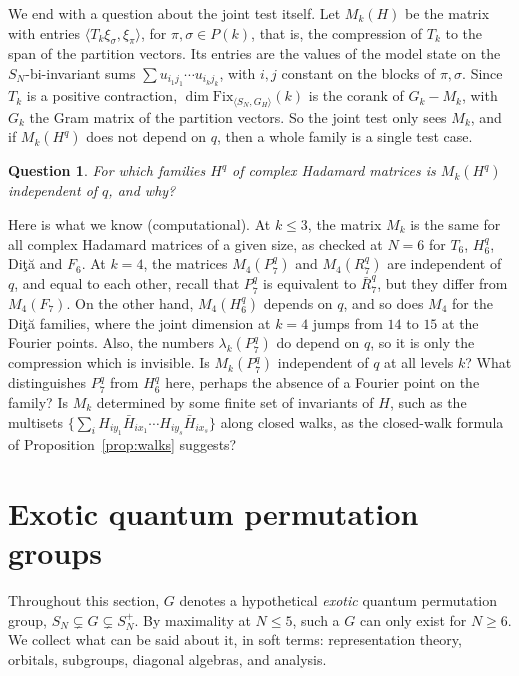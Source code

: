 \documentclass[11pt]{amsart}
\newtheorem{question}[theorem]{Question}
\theoremstyle{definition}
\theoremstyle{remark}
\theoremstyle{plain}
\numberwithin{equation}{section}
\numberwithin{table}{section}
\newcommand{\Fix}{\mathrm{Fix}}
\begin{document}
We end with a question about the joint test itself. Let $M_k(H)$ be the matrix with entries $\langle T_k\xi_\sigma,\xi_\pi\rangle$, for $\pi,\sigma\in P(k)$, that is, the compression of $T_k$ to the span of the partition vectors. Its entries are the values of the model state on the $S_N$-bi-invariant sums $\sum u_{i_1j_1}\cdots u_{i_kj_k}$, with $i,j$ constant on the blocks of $\pi,\sigma$. Since $T_k$ is a positive contraction, $\dim\Fix_{\langle S_N,G_H\rangle}(k)$ is the corank of $G_k-M_k$, with $G_k$ the Gram matrix of the partition vectors. So the joint test only sees $M_k$, and if $M_k(H^q)$ does not depend on $q$, then a whole family is a single test case.

\begin{question}\label{qu:invis}
For which families $H^q$ of complex Hadamard matrices is $M_k(H^q)$ independent of $q$, and why?
\end{question}

Here is what we know (computational). At $k\le3$, the matrix $M_k$ is the same for all complex Hadamard matrices of a given size, as checked at $N=6$ for $T_6$, $H_6^q$, Di{\c t}{\u a} and $F_6$. At $k=4$, the matrices $M_4(P_7^q)$ and $M_4(R_7^q)$ are independent of $q$, and equal to each other, recall that $P_7^q$ is equivalent to $\bar R_7^q$, but they differ from $M_4(F_7)$. On the other hand, $M_4(H_6^q)$ depends on $q$, and so does $M_4$ for the Di{\c t}{\u a} families, where the joint dimension at $k=4$ jumps from $14$ to $15$ at the Fourier points. Also, the numbers $\lambda_k(P_7^q)$ do depend on $q$, so it is only the compression which is invisible. Is $M_k(P_7^q)$ independent of $q$ at all levels $k$? What distinguishes $P_7^q$ from $H_6^q$ here, perhaps the absence of a Fourier point on the family? Is $M_k$ determined by some finite set of invariants of $H$, such as the multisets $\{\sum_iH_{iy_1}\bar H_{ix_1}\cdots H_{iy_s}\bar H_{ix_s}\}$ along closed walks, as the closed-walk formula of Proposition~\ref{prop:walks} suggests?




\section{Exotic quantum permutation groups}\label{sec:exotic}

Throughout this section, $G$ denotes a hypothetical \emph{exotic} quantum permutation group, $S_N\subsetneq G\subsetneq S_N^+$. By maximality at $N\le5$, such a $G$ can only exist for $N\ge6$. We collect what can be said about it, in soft terms: representation theory, orbitals, subgroups, diagonal algebras, and analysis.
\end{document}
